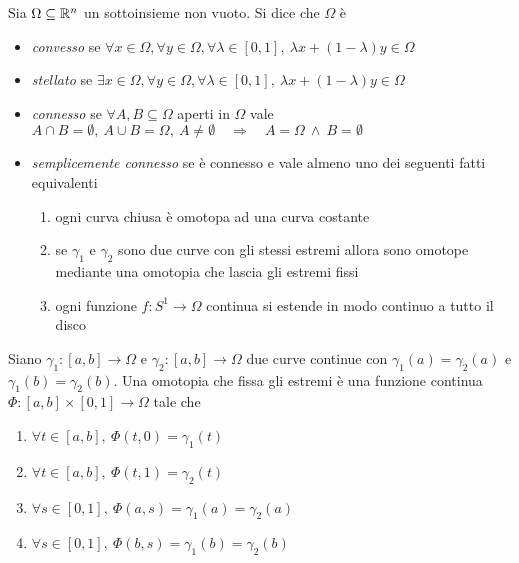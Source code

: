 \begin{definition}
	Sia $ \Omega \subseteq \mathbb{R}^n $ un sottoinsieme non vuoto. Si dice che $ \Omega $ è
	\begin{itemize}
		\item \emph{convesso} se $ \forall x \in \Omega, \forall y \in \Omega, \forall \lambda \in [0, 1], \ \lambda x + (1 - \lambda) y \in \Omega $
		\item \emph{stellato} se $ \exists x \in \Omega, \forall y \in \Omega, \forall \lambda \in [0, 1], \ \lambda x + (1 - \lambda) y \in \Omega $
		\item \emph{connesso} se $ \forall A, B \subseteq \Omega $ aperti in $ \Omega $ vale $ A \cap B = \emptyset, \ A \cup B = \Omega, \ A \neq \emptyset \quad  \Rightarrow \quad A = \Omega \ \wedge \ B = \emptyset $
		\item \emph{semplicemente connesso} se è connesso e vale almeno uno dei seguenti fatti equivalenti
		\begin{enumerate}[label = (\roman*)]
			\item ogni curva chiusa è omotopa ad una curva costante
			\item se $ \gamma_1 $ e $ \gamma_2 $ sono due curve con gli stessi estremi allora sono omotope mediante una omotopia che lascia gli estremi fissi
			\item ogni funzione $ f \colon S^1 \to \Omega $ continua si estende in modo continuo a tutto il disco
		\end{enumerate}
	\end{itemize}
\end{definition}

\begin{definition}[omotopia]
	Siano $ \gamma_1 \colon [a, b] \to \Omega $ e $ \gamma_2 \colon [a, b] \to \Omega $ due curve continue con $ \gamma_1(a) = \gamma_2(a) $ e $ \gamma_1(b) = \gamma_2(b) $. Una omotopia che fissa gli estremi è una funzione continua $ \Phi \colon [a, b] \times [0, 1] \to \Omega $ tale che
	\begin{enumerate}[label = (\roman*)]
		\item $ \forall t \in [a, b], \ \Phi(t, 0) = \gamma_1(t) $
		\item $ \forall t \in [a, b], \ \Phi(t, 1) = \gamma_2(t) $
		\item $ \forall s \in [0, 1], \ \Phi(a, s) = \gamma_1(a) = \gamma_2(a) $
		\item $ \forall s \in [0, 1], \ \Phi(b, s) = \gamma_1(b) = \gamma_2(b) $
	\end{enumerate}
\end{definition}


